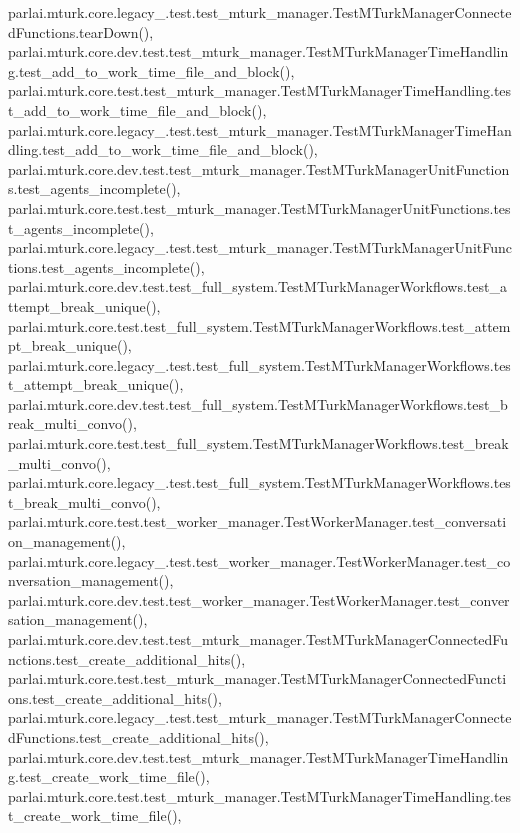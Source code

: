 parlai.\+mturk.\+core.\+legacy\+\_.\+test.\+test\+\_\+mturk\+\_\+manager.\+Test\+M\+Turk\+Manager\+Connected\+Functions.\+tear\+Down(), parlai.\+mturk.\+core.\+dev.\+test.\+test\+\_\+mturk\+\_\+manager.\+Test\+M\+Turk\+Manager\+Time\+Handling.\+test\+\_\+add\+\_\+to\+\_\+work\+\_\+time\+\_\+file\+\_\+and\+\_\+block(), parlai.\+mturk.\+core.\+test.\+test\+\_\+mturk\+\_\+manager.\+Test\+M\+Turk\+Manager\+Time\+Handling.\+test\+\_\+add\+\_\+to\+\_\+work\+\_\+time\+\_\+file\+\_\+and\+\_\+block(), parlai.\+mturk.\+core.\+legacy\+\_.\+test.\+test\+\_\+mturk\+\_\+manager.\+Test\+M\+Turk\+Manager\+Time\+Handling.\+test\+\_\+add\+\_\+to\+\_\+work\+\_\+time\+\_\+file\+\_\+and\+\_\+block(), parlai.\+mturk.\+core.\+dev.\+test.\+test\+\_\+mturk\+\_\+manager.\+Test\+M\+Turk\+Manager\+Unit\+Functions.\+test\+\_\+agents\+\_\+incomplete(), parlai.\+mturk.\+core.\+test.\+test\+\_\+mturk\+\_\+manager.\+Test\+M\+Turk\+Manager\+Unit\+Functions.\+test\+\_\+agents\+\_\+incomplete(), parlai.\+mturk.\+core.\+legacy\+\_.\+test.\+test\+\_\+mturk\+\_\+manager.\+Test\+M\+Turk\+Manager\+Unit\+Functions.\+test\+\_\+agents\+\_\+incomplete(), parlai.\+mturk.\+core.\+dev.\+test.\+test\+\_\+full\+\_\+system.\+Test\+M\+Turk\+Manager\+Workflows.\+test\+\_\+attempt\+\_\+break\+\_\+unique(), parlai.\+mturk.\+core.\+test.\+test\+\_\+full\+\_\+system.\+Test\+M\+Turk\+Manager\+Workflows.\+test\+\_\+attempt\+\_\+break\+\_\+unique(), parlai.\+mturk.\+core.\+legacy\+\_.\+test.\+test\+\_\+full\+\_\+system.\+Test\+M\+Turk\+Manager\+Workflows.\+test\+\_\+attempt\+\_\+break\+\_\+unique(), parlai.\+mturk.\+core.\+dev.\+test.\+test\+\_\+full\+\_\+system.\+Test\+M\+Turk\+Manager\+Workflows.\+test\+\_\+break\+\_\+multi\+\_\+convo(), parlai.\+mturk.\+core.\+test.\+test\+\_\+full\+\_\+system.\+Test\+M\+Turk\+Manager\+Workflows.\+test\+\_\+break\+\_\+multi\+\_\+convo(), parlai.\+mturk.\+core.\+legacy\+\_.\+test.\+test\+\_\+full\+\_\+system.\+Test\+M\+Turk\+Manager\+Workflows.\+test\+\_\+break\+\_\+multi\+\_\+convo(), parlai.\+mturk.\+core.\+test.\+test\+\_\+worker\+\_\+manager.\+Test\+Worker\+Manager.\+test\+\_\+conversation\+\_\+management(), parlai.\+mturk.\+core.\+legacy\+\_.\+test.\+test\+\_\+worker\+\_\+manager.\+Test\+Worker\+Manager.\+test\+\_\+conversation\+\_\+management(), parlai.\+mturk.\+core.\+dev.\+test.\+test\+\_\+worker\+\_\+manager.\+Test\+Worker\+Manager.\+test\+\_\+conversation\+\_\+management(), parlai.\+mturk.\+core.\+dev.\+test.\+test\+\_\+mturk\+\_\+manager.\+Test\+M\+Turk\+Manager\+Connected\+Functions.\+test\+\_\+create\+\_\+additional\+\_\+hits(), parlai.\+mturk.\+core.\+test.\+test\+\_\+mturk\+\_\+manager.\+Test\+M\+Turk\+Manager\+Connected\+Functions.\+test\+\_\+create\+\_\+additional\+\_\+hits(), parlai.\+mturk.\+core.\+legacy\+\_.\+test.\+test\+\_\+mturk\+\_\+manager.\+Test\+M\+Turk\+Manager\+Connected\+Functions.\+test\+\_\+create\+\_\+additional\+\_\+hits(), parlai.\+mturk.\+core.\+dev.\+test.\+test\+\_\+mturk\+\_\+manager.\+Test\+M\+Turk\+Manager\+Time\+Handling.\+test\+\_\+create\+\_\+work\+\_\+time\+\_\+file(), parlai.\+mturk.\+core.\+test.\+test\+\_\+mturk\+\_\+manager.\+Test\+M\+Turk\+Manager\+Time\+Handling.\+test\+\_\+create\+\_\+work\+\_\+time\+\_\+file(), 